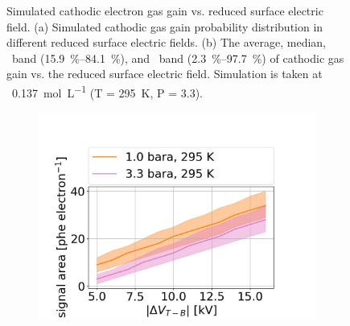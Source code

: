 \begin{figure}[!htbp]
\begin{subfigure}[b]{0.7\textwidth}
	\end{subfigure}
	\caption[Simulated cathodic electron gas gain vs. reduced surface electric field.]{Simulated cathodic electron gas gain vs. reduced surface electric field. (a) Simulated cathodic gas gain probability distribution in different reduced surface electric fields. (b) The average, median, \onesigma\ band (\SIrange{15.9}{84.1}{\percent}), and \twosigma\ band (\SIrange{2.3}{97.7}{\percent}) of cathodic gas gain vs. the reduced surface electric field. Simulation is taken at \opgd\ \SI{0.137}{\mole\per\liter} (T = \SI{295}{\kelvin}, P = \SI{3.3}{\bara}).}
	\label{fig:electron multiplication}
\end{figure}%

\begin{figure}[!htbp]
	\centering
	\begin{subfigure}[b]{0.7\textwidth}
		\centering
		\includegraphics[width=\figurewidth,clip,trim={0 0 0 0}]{Figures/GasTest/xenonProperties/MultiplicationPhotonCollectionNaiveProfileMeanSigma3300mbarPerDriftElecton.jpg}
		\caption{}
		\label{fig:photon per drifted electron }
	\end{subfigure}
	\begin{subfigure}[b]{0.7\textwidth}
		\centering

\end{subfigure}
\end{figure}
